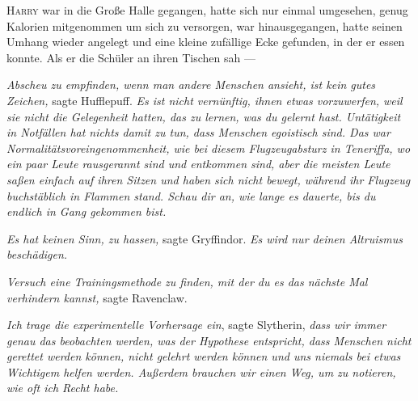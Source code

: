 

\lettrine{H}{arry} war in die Große Halle gegangen, hatte sich nur einmal umgesehen, genug Kalorien mitgenommen um sich zu versorgen, war hinausgegangen, hatte seinen Umhang wieder angelegt und eine kleine zufällige Ecke gefunden, in der er essen konnte. Als er die Schüler an ihren Tischen sah —

\emph{Abscheu zu empfinden, wenn man andere Menschen ansieht, ist kein gutes Zeichen,} sagte Hufflepuff. \emph{Es ist nicht vernünftig, ihnen etwas vorzuwerfen, weil sie nicht die Gelegenheit hatten, das zu lernen, was du gelernt hast. Untätigkeit in Notfällen hat nichts damit zu tun, dass Menschen egoistisch sind. Das war Normalitätsvoreingenommenheit, wie bei diesem Flugzeugabsturz in Teneriffa, wo ein paar Leute rausgerannt sind und entkommen sind, aber die meisten Leute saßen einfach auf ihren Sitzen und haben sich nicht bewegt, während ihr Flugzeug buchstäblich in Flammen stand. Schau dir an, wie lange es dauerte, bis \emph{du} endlich in Gang gekommen bist.}

\emph{Es hat keinen Sinn, zu hassen,} sagte Gryffindor. \emph{Es wird nur deinen Altruismus beschädigen.}

\emph{Versuch eine Trainingsmethode zu finden, mit der du es das nächste Mal verhindern kannst,} sagte Ravenclaw.

\emph{Ich trage die experimentelle Vorhersage ein}, sagte Slytherin, \emph{dass wir immer genau das beobachten werden, was der Hypothese entspricht, dass Menschen nicht gerettet werden können, nicht gelehrt werden können und uns niemals bei etwas Wichtigem helfen werden. Außerdem brauchen wir einen Weg, um zu notieren, wie oft ich Recht habe.}

